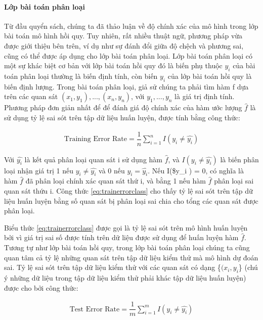 \documentclass[
]{article}
\begin{document}
\hypertarget{lux1edbp-buxe0i-touxe1n-phuxe2n-loux1ea1i}{%
\paragraph{Lớp bài toán phân loại}\label{lux1edbp-buxe0i-touxe1n-phuxe2n-loux1ea1i}}

Từ đầu quyển sách, chúng ta đã thảo luận về độ chính xác của mô hình trong lớp bài toán mô hình hồi quy. Tuy nhiên, rất nhiều thuật ngữ, phương pháp vừa được giới thiệu bên trên, ví dụ như sự đánh đổi giữa độ chệch và phương sai, cũng có thể được áp dụng cho lớp bài toán phân loại. Lớp bài toán phân loại có một sự khác biệt cơ bản với lớp bài toán hồi quy đó là biến phụ thuộc \(y_i\) của bài toán phân loại thường là biến định tính, còn biến \(y_i\) của lớp bài toán hồi quy là biến định lượng. Trong bài toán phân loại, giả sử chúng ta phải tìm hàm f dựa trên các quan sát \({(x_1, y_1),...,(x_n, y_n)}\), với \(y_1,...,y_n\) là giá trị định tính. Phương pháp đơn giản nhất để để đánh giá độ chính xác của hàm ước lượng \(\hat{f}\) là sử dụng tỷ lệ sai sót trên tập dữ liệu huấn luyện, được tính bằng công thức:

\begin{align*}
\text{Training Error Rate} = \dfrac{1}{n} \sum\limits_{i = 1}^{n} I(y_i \neq \hat{y_i})
\label{eq:trainerrorclass}
\end{align*}

Với \(\hat{y_i}\) là kết quả phân loại quan sát i sử dụng hàm \(\hat{f}\), và \(I(y_i \neq \hat{y_i})\) là biến phân loại nhận giá trị 1 nếu \(y_i \neq \hat{y_i}\) và 0 nếu \(y_i = \hat{y_i}\). Nếu I(\$y\_i \neq {}) = 0, có nghĩa là hàm \(\hat{f}\) đã phân loại chính xác quan sát thứ i, và bằng 1 nếu hàm \(\hat{f}\) phân loại sai quan sát thứu i. Công thức \eqref{eq:trainerrorclass} cho
thấy tỷ lệ sai sót trên tập dữ liệu huấn luyện bằng số quan sát bị phân loại sai chia cho tổng các quan sát được phân loại.

Biểu thức \eqref{eq:trainerrorclass} được gọi là tỷ lệ sai sót trên mô hình huấn luyện bởi vì giá trị sai số được tính trên dữ liệu được sử dụng để huấn luyện hàm \(\hat{f}\). Tương tự như lớp bài toán hồi quy, trong lớp bài toán phân loại chúng ta cũng quan tâm cả tỷ lệ những quan sát trên tập dữ liệu kiểm thử mà mô hình dự đoán sai. Tỷ lệ sai sót trên tập dữ liệu kiểm thử với các quan sát có dạng \{\((x_i, y_i\)\} (chú ý những dữ liệu trong tập dữ liệu kiểm thử phải khác tập dữ liệu huấn luyện) được cho bởi công thức:

\begin{align*}
\text{Test Error Rate} = \dfrac{1}{m} \sum\limits_{i = 1}^{m} I(y_i \neq \hat{y_i})
\label{eq:testerrorclass}
\end{align*}
\end{document}
